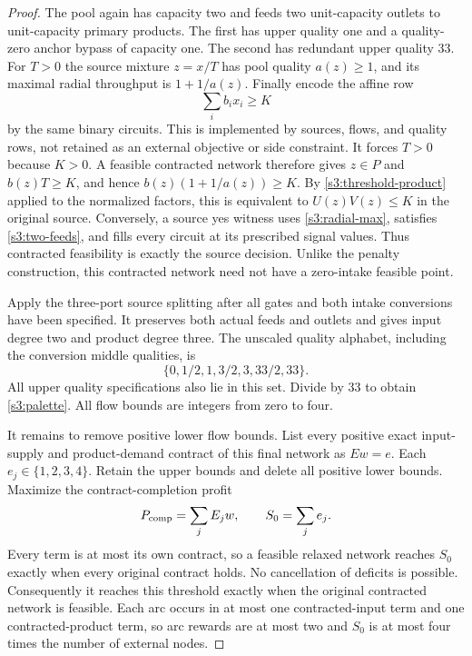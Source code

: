 \begin{proof}
The pool again has capacity two and feeds two unit-capacity outlets to
unit-capacity primary products. The first has upper quality one and a
quality-zero anchor bypass of capacity one. The second has redundant
upper quality 33. For $T>0$ the source mixture $z=x/T$ has pool quality
$a(z)\ge1$, and its maximal radial throughput is $1+1/a(z)$.
Finally encode the affine row
\begin{equation}
 \sum_i b_ix_i\ge K\label{s3:physical-threshold}
\end{equation}
by the same binary circuits. This is implemented by sources, flows, and
quality rows, not retained as an external objective or side constraint.
It forces $T>0$ because $K>0$. A feasible contracted network therefore
gives $z\in P$ and $b(z)T\ge K$, and hence
$b(z)(1+1/a(z))\ge K$. By \eqref{s3:threshold-product} applied to
the normalized factors, this is equivalent to $U(z)V(z)\le K$ in the
original source. Conversely, a source yes witness uses
\eqref{s3:radial-max}, satisfies \eqref{s3:two-feeds}, and fills every
circuit at its prescribed signal values. Thus contracted feasibility is
exactly the source decision. Unlike the penalty construction, this
contracted network need not have a zero-intake feasible point.

Apply the three-port source splitting after all gates and both intake
conversions have been specified. It preserves both actual feeds and
outlets and gives input degree two and product degree three. The
unscaled quality alphabet, including the conversion middle qualities,
is
\[
 \{0,1/2,1,3/2,3,33/2,33\}.
\]
All upper quality specifications also lie in this set. Divide by 33 to
obtain \eqref{s3:palette}. All flow bounds are integers from zero to four.

It remains to remove positive lower flow bounds. List every positive
exact input-supply and product-demand contract of this final network as
$Ew=e$. Each $e_j\in\{1,2,3,4\}$. Retain the upper bounds and delete
all positive lower bounds. Maximize the contract-completion profit
\begin{equation}
 P_{\rm comp}=\sum_j E_jw,\qquad
 S_0=\sum_j e_j.\label{s3:completion}
\end{equation}
Every term is at most its own contract, so a feasible relaxed network
reaches $S_0$ exactly when every original contract holds. No cancellation
of deficits is possible. Consequently it reaches this threshold exactly
when the original contracted network is feasible. Each arc occurs in
at most one contracted-input term and one contracted-product term, so
arc rewards are at most two and $S_0$ is at most four times the number
of external nodes.


\end{proof}
